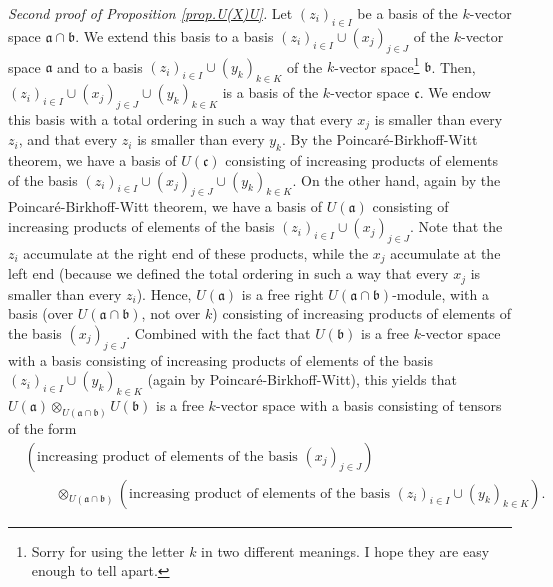 \documentclass
[numbers=enddot,12pt,final,onecolumn,german,notitlepage]{scrartcl}%
\theoremstyle{definition}
\begin{document}
\textit{Second proof of Proposition \ref{prop.U(X)U}.} Let $\left(
z_{i}\right)  _{i\in I}$ be a basis of the $k$-vector space $\mathfrak{a}%
\cap\mathfrak{b}$. We extend this basis to a basis $\left(  z_{i}\right)
_{i\in I}\cup\left(  x_{j}\right)  _{j\in J}$ of the $k$-vector space
$\mathfrak{a}$ and to a basis $\left(  z_{i}\right)  _{i\in I}\cup\left(
y_{k}\right)  _{k\in K}$ of the $k$-vector space\footnote{Sorry for using the
letter $k$ in two different meanings. I hope they are easy enough to tell
apart.} $\mathfrak{b}$. Then, $\left(  z_{i}\right)  _{i\in I}\cup\left(
x_{j}\right)  _{j\in J}\cup\left(  y_{k}\right)  _{k\in K}$ is a basis of the
$k$-vector space $\mathfrak{c}$. We endow this basis with a total ordering in
such a way that every $x_{j}$ is smaller than every $z_{i}$, and that every
$z_{i}$ is smaller than every $y_{k}$. By the Poincar\'{e}-Birkhoff-Witt
theorem, we have a basis of $U\left(  \mathfrak{c}\right)  $ consisting of
increasing products of elements of the basis $\left(  z_{i}\right)  _{i\in
I}\cup\left(  x_{j}\right)  _{j\in J}\cup\left(  y_{k}\right)  _{k\in K}$. On
the other hand, again by the Poincar\'{e}-Birkhoff-Witt theorem, we have a
basis of $U\left(  \mathfrak{a}\right)  $ consisting of increasing products of
elements of the basis $\left(  z_{i}\right)  _{i\in I}\cup\left(
x_{j}\right)  _{j\in J}$. Note that the $z_{i}$ accumulate at the right end of
these products, while the $x_{j}$ accumulate at the left end (because we
defined the total ordering in such a way that every $x_{j}$ is smaller than
every $z_{i}$). Hence, $U\left(  \mathfrak{a}\right)  $ is a free right
$U\left(  \mathfrak{a}\cap\mathfrak{b}\right)  $-module, with a basis (over
$U\left(  \mathfrak{a}\cap\mathfrak{b}\right)  $, not over $k$) consisting of
increasing products of elements of the basis $\left(  x_{j}\right)  _{j\in J}%
$. Combined with the fact that $U\left(  \mathfrak{b}\right)  $ is a free
$k$-vector space with a basis consisting of increasing products of elements of
the basis $\left(  z_{i}\right)  _{i\in I}\cup\left(  y_{k}\right)  _{k\in K}$
(again by Poincar\'{e}-Birkhoff-Witt), this yields that $U\left(
\mathfrak{a}\right)  \otimes_{U\left(  \mathfrak{a}\cap\mathfrak{b}\right)
}U\left(  \mathfrak{b}\right)  $ is a free $k$-vector space with a basis
consisting of tensors of the form%
\begin{align*}
&  \left(  \text{increasing product of elements of the basis }\left(
x_{j}\right)  _{j\in J}\right) \\
&  \ \ \ \ \ \ \ \ \ \ \otimes_{U\left(  \mathfrak{a}\cap\mathfrak{b}\right)
}\left(  \text{increasing product of elements of the basis }\left(
z_{i}\right)  _{i\in I}\cup\left(  y_{k}\right)  _{k\in K}\right)  .
\end{align*}
\end{document}
